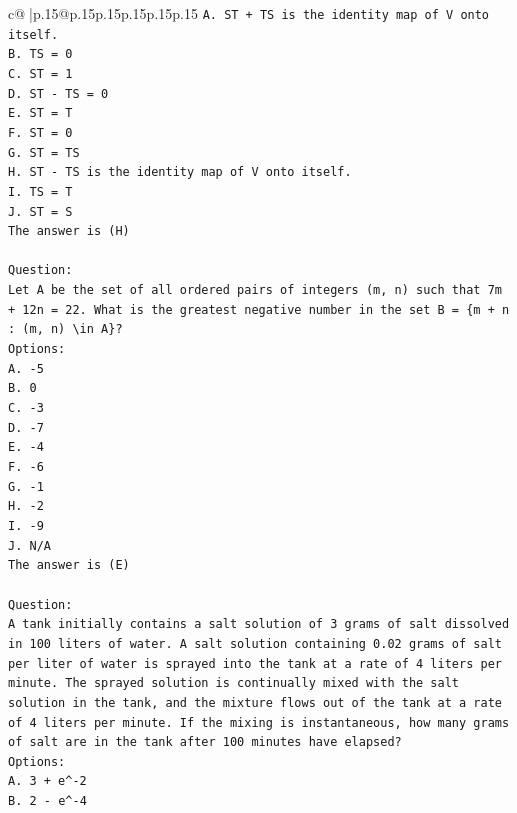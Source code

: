 \documentclass{article}
\begin{document}
{\begin{supertabular}{c@{$\;$}|p{.15\linewidth}@{}p{.15\linewidth}p{.15\linewidth}p{.15\linewidth}p{.15\linewidth}p{.15\linewidth}}
{{{\texttt{A. ST + TS is the identity map of V onto itself.} \\
\texttt{B. TS = 0} \\
\texttt{C. ST = 1} \\
\texttt{D. ST {-} TS = 0} \\
\texttt{E. ST = T} \\
\texttt{F. ST = 0} \\
\texttt{G. ST = TS} \\
\texttt{H. ST {-} TS is the identity map of V onto itself.} \\
\texttt{I. TS = T} \\
\texttt{J. ST = S} \\
\texttt{The answer is (H)} \\
\\ 
\texttt{Question:} \\
\texttt{Let A be the set of all ordered pairs of integers (m, n) such that 7m + 12n = 22. What is the greatest negative number in the set B = \{m + n : (m, n) \textbackslash{}in A\}?} \\
\texttt{Options:} \\
\texttt{A. {-}5} \\
\texttt{B. 0} \\
\texttt{C. {-}3} \\
\texttt{D. {-}7} \\
\texttt{E. {-}4} \\
\texttt{F. {-}6} \\
\texttt{G. {-}1} \\
\texttt{H. {-}2} \\
\texttt{I. {-}9} \\
\texttt{J. N/A} \\
\texttt{The answer is (E)} \\
\\ 
\texttt{Question:} \\
\texttt{A tank initially contains a salt solution of 3 grams of salt dissolved in 100 liters of water. A salt solution containing 0.02 grams of salt per liter of water is sprayed into the tank at a rate of 4 liters per minute. The sprayed solution is continually mixed with the salt solution in the tank, and the mixture flows out of the tank at a rate of 4 liters per minute. If the mixing is instantaneous, how many grams of salt are in the tank after 100 minutes have elapsed?} \\
\texttt{Options:} \\
\texttt{A. 3 + e\^{}{-}2} \\
\texttt{B. 2 {-} e\^{}{-}4} \\
}}}
\end{supertabular}}
\end{document}
